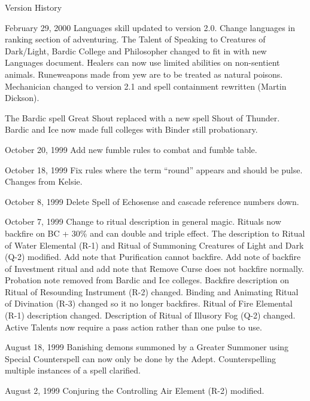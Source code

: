 \begin{Chapter}{Version History}
\begin{Description}
\item[February 29, 2000] Languages skill updated to version 2.0.
  Change languages in ranking section of adventuring.  The Talent of
  Speaking to Creatures of Dark/Light, Bardic College and Philosopher
  changed to fit in with new Languages document.  Healers can now use
  limited abilities on non-sentient animals. Runeweapons made from
  yew are to be treated as natural poisons.  Mechanician changed to
  version 2.1 and spell containment rewritten (Martin Dickson).

  The Bardic spell Great Shout replaced with a new spell Shout of
  Thunder.  Bardic and Ice now made full colleges with Binder still
  probationary.

\item[October 20, 1999] Add new fumble rules to combat and fumble
  table.

\item[October 18, 1999] Fix rules where the term “round” appears and
  should be pulse.  Changes from Kelsie.

\item[October 8, 1999] Delete Spell of Echosense and cascade reference
  numbers down.

\item[October 7, 1999] Change to ritual description in general
  magic. Rituals now backfire on BC + 30\% and can double and triple
  effect. The description to Ritual of Water Elemental (R-1) and
  Ritual of Summoning Creatures of Light and Dark (Q-2) modified.  Add
  note that Purification cannot backfire. Add note of backfire of
  Investment ritual and add note that Remove Curse does not backfire
  normally. Probation note removed from Bardic and Ice colleges.
  Backfire description on Ritual of Resounding Instrument (R-2)
  changed.  Binding and Animating Ritual of Divination (R-3) changed
  so it no longer backfires.  Ritual of Fire Elemental (R-1)
  description changed. Description of Ritual of Illusory Fog (Q-2)
  changed.  Active Talents now require a pass action rather than one
  pulse to use.

\item[August 18, 1999] Banishing demons summoned by a Greater Summoner
  using Special Counterspell can now only be done by the Adept.
  Counterspelling multiple instances of a spell clarified.

\item[August 2, 1999] Conjuring the Controlling Air Element (R-2)
  modified.

\end{Description}


\end{Chapter}
